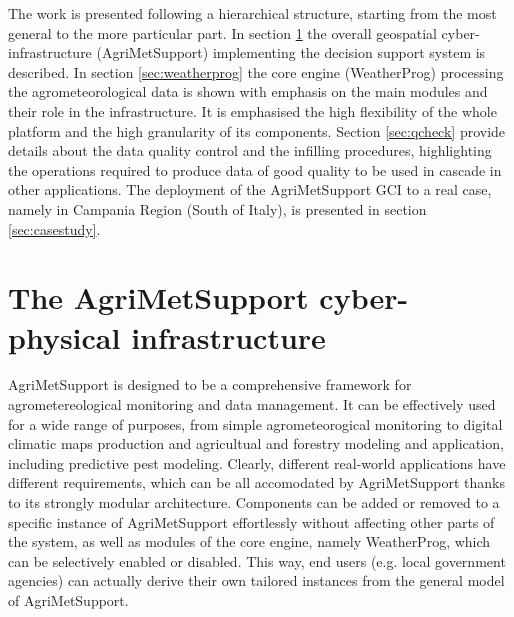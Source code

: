 \documentclass[authoryear,preprint,review,12pt]{elsarticle}
\begin{document}
The work is presented following a hierarchical structure, starting from the most general to the more particular part.
In section \ref{sec:gci} the overall geospatial cyber-infrastructure (AgriMetSupport) implementing the decision support system is described.
In section \ref{sec:weatherprog} the core engine (WeatherProg) processing the agrometeorological data is shown with emphasis on the main modules and their role in the infrastructure.
It is emphasised the high flexibility of the whole platform and the high granularity of its components.
Section \ref{sec:qcheck} provide details about the data quality control and the infilling procedures, highlighting the operations required to produce data of good quality to be used in cascade in other 
applications.
The deployment of the AgriMetSupport GCI to a real case, namely in Campania Region (South of Italy), is presented in section \ref{sec:casestudy}.

\section{The AgriMetSupport cyber-physical infrastructure} \label{sec:gci}

AgriMetSupport is designed to be a comprehensive framework for agrometereological monitoring and data management.
It can be effectively used for a wide range of purposes, from simple agrometeorogical monitoring to digital climatic maps production and agricultual and forestry modeling and application, including predictive pest modeling.
Clearly, different real-world applications have different requirements, which can be all accomodated by AgriMetSupport thanks to its strongly modular architecture.
Components can be added or removed to a specific instance of AgriMetSupport effortlessly without affecting other parts of the system, as well as modules of the core engine, namely WeatherProg, which can be selectively enabled or disabled.
This way, end users (e.g. local government agencies) can actually derive their own tailored instances from the general model of AgriMetSupport.
\end{document}
